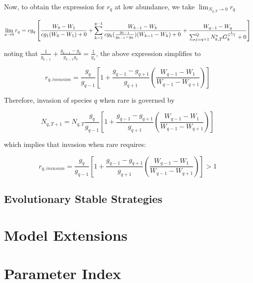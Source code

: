 \documentclass{article}
\begin{document}
  Now, to obtain the expression for $r_{q}$ at low abundance, we take
  $\lim_{N_{q, T}\to0}\! r_{q}$

  \begin{dmath*}
  \lim_{x\to0}r_{q} = c g_{q} \left[ \frac{W_{0} - W_{1}}{c g_{1} (W_{0} - W_{1}) + 0} + \sum_{k = 1}^{q-1}\frac{W_{k -1} - W_{k}}{c g_{k}(\frac{g_{k-1}}{g_{k-1} - g_{k}})(W_{k-1} - W_{k}) + 0} + \frac{W_{q-1} - W_{q}}{\sum_{j = q+1}^{Q}N_{k, T}^{*}G_{k}^{\frac{1}{\nu - 1}} + 0} \right] $$
  \end{dmath*}

  noting that
  $\frac{1}{g_{k-1}} + \frac{g_{k-1} - g_{k}}{g_{k-1}g_{k}} = \frac{1}{g_{k}}$,
  the above expression simplifies to

  $$ r_{q, invasion} = \frac{g_{q}}{g_{q-1}}\left[ 1 + \frac{g_{q-1} - g_{q+1}}{g_{q+1}} (\frac{W_{q-1} - W_{1}}{W_{q-1} - W_{q+1}}) \right] $$

  Therefore, invasion of species $q$ when rare is governed by

  \begin{equation} \label{eq:invasion}
    N_{q, T+1} = N_{q, T}\frac{g_{q}}{g_{q-1}}\left[ 1 + \frac{g_{q-1} - g_{q+1}}{g_{q+1}} (\frac{W_{q-1} - W_{1}}{W_{q-1} - W_{q+1}}) \right]
  \end{equation}

  which implies that invasion when rare requires:

  $$ r_{q, invasion} =\frac{g_{q}}{g_{q-1}}\left[ 1 + \frac{g_{q-1} - g_{q+1}}{g_{q+1}} (\frac{W_{q-1} - W_{1}}{W_{q-1} - W_{q+1}}) \right] > 1 $$

  \subsection{Evolutionary Stable Strategies}


  

  \section{Model Extensions}

  \section{Parameter Index} \label{variable dictionary}
\end{document}
